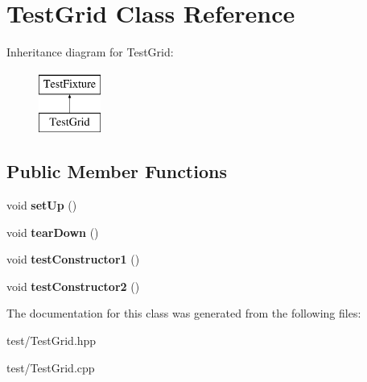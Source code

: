 \hypertarget{class_test_grid}{}\section{Test\+Grid Class Reference}
\label{class_test_grid}
Inheritance diagram for Test\+Grid\+:\begin{figure}[H]
\begin{center}
\leavevmode
\includegraphics[height=2.000000cm]{class_test_grid}
\end{center}
\end{figure}
\subsection*{Public Member Functions}
\begin{DoxyCompactItemize}
\item 
\mbox{\label{class_test_grid_afd080168a37a3a3374fa11b0a48ef1bf}} 
void {\bfseries set\+Up} ()
\item 
\mbox{\label{class_test_grid_adf786b04244594688bf871ded5cbf860}} 
void {\bfseries tear\+Down} ()
\item 
\mbox{\label{class_test_grid_a5f4d88062bad9698b14e99067cb6a3bf}} 
void {\bfseries test\+Constructor1} ()
\item 
\mbox{\label{class_test_grid_accd340be5dc916a1769bab50471c1cc8}} 
void {\bfseries test\+Constructor2} ()
\end{DoxyCompactItemize}


The documentation for this class was generated from the following files\+:\begin{DoxyCompactItemize}
\item 
test/Test\+Grid.\+hpp\item 
test/Test\+Grid.\+cpp\end{DoxyCompactItemize}
